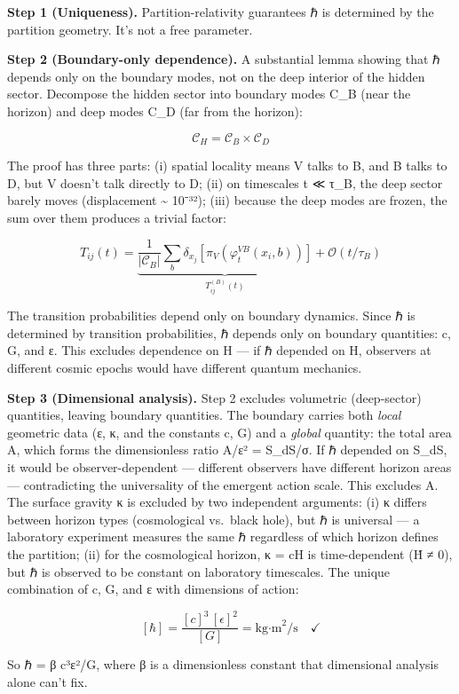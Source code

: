 \documentclass[
]{article}
\begin{document}
\textbf{Step 1 (Uniqueness).} Partition-relativity guarantees ℏ is
determined by the partition geometry. It's not a free parameter.

\textbf{Step 2 (Boundary-only dependence).} A substantial lemma showing
that ℏ depends only on the boundary modes, not on the deep interior of
the hidden sector. Decompose the hidden sector into boundary modes C\_B
(near the horizon) and deep modes C\_D (far from the horizon):

\[\mathcal{C}_H = \mathcal{C}_B \times \mathcal{C}_D\]

The proof has three parts: (i) spatial locality means V talks to B, and
B talks to D, but V doesn't talk directly to D; (ii) on timescales t ≪
τ\_B, the deep sector barely moves (displacement \textasciitilde{}
10⁻³²); (iii) because the deep modes are frozen, the sum over them
produces a trivial factor:

\[T_{ij}(t) = \underbrace{\frac{1}{|\mathcal{C}_B|} \sum_{b} \delta_{x_j}[\pi_V(\varphi_t^{VB}(x_i, b))]}_{T^{(B)}_{ij}(t)} + \mathcal{O}(t/\tau_B)\]

The transition probabilities depend only on boundary dynamics. Since ℏ
is determined by transition probabilities, ℏ depends only on boundary
quantities: c, G, and ε. This excludes dependence on H --- if ℏ depended
on H, observers at different cosmic epochs would have different quantum
mechanics.

\textbf{Step 3 (Dimensional analysis).} Step 2 excludes volumetric
(deep-sector) quantities, leaving boundary quantities. The boundary
carries both \emph{local} geometric data (ε, κ, and the constants c, G)
and a \emph{global} quantity: the total area A, which forms the
dimensionless ratio A/ε² = S\_dS/σ. If ℏ depended on S\_dS, it would be
observer-dependent --- different observers have different horizon areas
--- contradicting the universality of the emergent action scale. This
excludes A. The surface gravity κ is excluded by two independent
arguments: (i) κ differs between horizon types (cosmological vs.~black
hole), but ℏ is universal --- a laboratory experiment measures the same
ℏ regardless of which horizon defines the partition; (ii) for the
cosmological horizon, κ = cH is time-dependent (Ḣ ≠ 0), but ℏ is
observed to be constant on laboratory timescales. The unique combination
of c, G, and ε with dimensions of action:

\[[\hbar] = \frac{[c]^3 \, [\epsilon]^2}{[G]} = \text{kg·m}^2/\text{s} \quad \checkmark\]

So ℏ = β c³ε²/G, where β is a dimensionless constant that dimensional
analysis alone can't fix.
\end{document}
